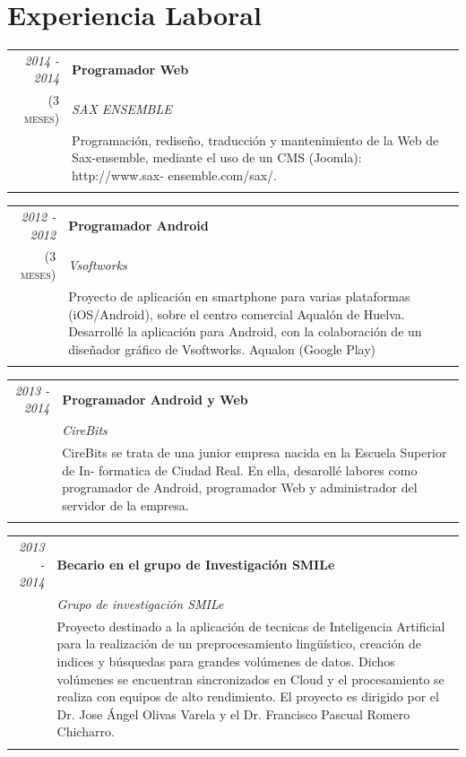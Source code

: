 \documentclass[runningheads,a4paper]{llncs}
\theoremstyle{break}
\begin{document}
\section*{Experiencia Laboral}

\setlength{\tabcolsep}{2em}

\begin{tabular}{r|p{11cm}}
 \emph{2014 - 2014 } & \textbf{Programador Web} \\\textsc{(3 meses)}&\emph{SAX ENSEMBLE}\\&\footnotesize{Programación, rediseño, traducción y mantenimiento de la Web de Sax-ensemble, mediante el uso de un CMS (Joomla): http://www.sax- ensemble.com/sax/.}\\\multicolumn{2}{c}{} \\
 \end{tabular}

 \begin{tabular}{r|p{11cm}}
 \emph{2012 - 2012 } & \textbf{Programador Android} \\\textsc{(3 meses)}&\emph{Vsoftworks}\\&\footnotesize{Proyecto de aplicación en smartphone para varias plataformas (iOS/Android), sobre el centro comercial Aqualón de Huelva. Desarrollé la aplicación para Android, con la colaboración de un diseñador gráfico de Vsoftworks. Aqualon (Google Play)}\\\multicolumn{2}{c}{} \\
 \end{tabular}

 \begin{tabular}{r|p{11cm}}
 \emph{2013 - 2014 } & \textbf{Programador Android y Web} \\\textsc{}&\emph{CireBits}\\&\footnotesize{CireBits se trata de una junior empresa nacida en la Escuela Superior de In- formatica de Ciudad Real. En ella, desarollé labores como programador de Android, programador Web y administrador del servidor de la empresa.}\\\multicolumn{2}{c}{} \\
 \end{tabular}


\begin{tabular}{r|p{11cm}}
  \emph{2013 - 2014 } & \textbf{Becario en el grupo de Investigación SMILe} \\\textsc{}&\emph{Grupo de investigación SMILe}\\&\footnotesize{Proyecto destinado a la aplicación de tecnicas de Inteligencia Artificial para la realización de un preprocesamiento lingüístico, creación de indices y búsquedas para grandes volúmenes de datos. Dichos volúmenes se encuentran sincronizados en Cloud y el procesamiento se realiza con equipos de alto rendimiento. El proyecto es dirigido por el Dr. Jose Ángel Olivas Varela y el Dr. Francisco Pascual Romero Chicharro.}\\\multicolumn{2}{c}{} \\
\end{tabular}
\end{document}
